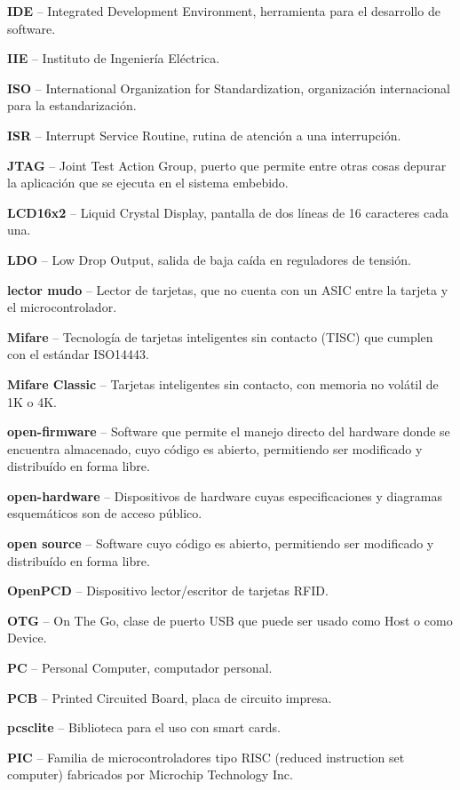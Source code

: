 \begin{glosario}
{\bf{IDE}} – Integrated Development Environment, herramienta para el desarrollo de software.

{\bf{IIE}} – Instituto de Ingeniería Eléctrica.

{\bf{ISO}} – International Organization for Standardization, organización internacional para la estandarización.

{\bf{ISR}} – Interrupt Service Routine, rutina de atención a una interrupción.

{\bf{JTAG}} – Joint Test Action Group, puerto que permite entre otras cosas depurar la aplicación que se ejecuta en el sistema embebido.

{\bf{LCD16x2}} – Liquid Crystal Display, pantalla de dos líneas de 16 caracteres cada una.

{\bf{LDO}} – Low Drop Output, salida de baja caída en reguladores de tensión.

{\bf{lector mudo}} – Lector de tarjetas, que no cuenta con un ASIC entre la tarjeta y el microcontrolador.

{\bf{Mifare}} – Tecnología de tarjetas inteligentes sin contacto (TISC) que cumplen con el estándar ISO14443.

{\bf{Mifare Classic}} – Tarjetas inteligentes sin contacto, con memoria no volátil de 1K o 4K.

{\bf{open-firmware}} – Software que permite el manejo directo del hardware donde se encuentra almacenado, cuyo código es abierto, permitiendo ser modificado y distribuído en forma libre.

{\bf{open-hardware}} – Dispositivos de hardware cuyas especificaciones y diagramas esquemáticos son de acceso público.

{\bf{open source}} – Software cuyo código es abierto, permitiendo ser modificado y distribuído en forma libre.

{\bf{OpenPCD}} – Dispositivo lector/escritor de tarjetas RFID.

{\bf{OTG}} – On The Go, clase de puerto USB que puede ser usado como Host o como Device.

{\bf{PC}} – Personal Computer, computador personal.

{\bf{PCB}} – Printed Circuited Board, placa de circuito impresa.

{\bf{pcsclite}} – Biblioteca para el uso con smart cards.

{\bf{PIC}} – Familia de microcontroladores tipo RISC (reduced instruction set computer) fabricados por Microchip Technology Inc.


\end{glosario}
